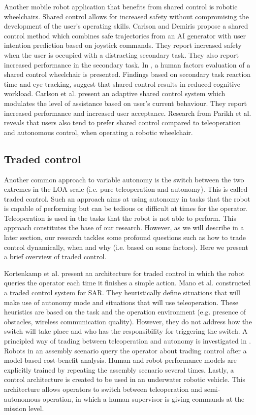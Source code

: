 \documentclass[a4paper,12pt,oneside,openright]{bhamthesis}
\begin{document}
Another mobile robot application that benefits from shared control is robotic wheelchairs. Shared control allows for increased safety without compromising the development of the user's operating skills. Carlson and Demiris \citep{Carlson2010} propose a shared control method which combines safe trajectories from an AI generator with user intention prediction based on joystick commands. They report increased safety when the user is occupied with a distracting secondary task. They also report increased performance in the secondary task. In \citep{Carlson2012}, a human factors evaluation of a shared control wheelchair is presented. Findings based on secondary task reaction time and eye tracking, suggest that shared control results in reduced cognitive workload. Carlson et al. \citep{Carlson2012a} present an adaptive shared control system which modulates the level of assistance based on user's current behaviour. They report increased performance and increased user acceptance. Research from Parikh et al. \citep{Parikh2005} reveals that users also tend to prefer shared control compared to teleoperation and autonomous control, when operating a robotic wheelchair.

\subsection{Traded control}
Another common approach to variable autonomy is the switch between the two extremes in the LOA scale (i.e. pure teleoperation and autonomy). This is called traded control. Such an approach aims at using autonomy in tasks that the robot is capable of performing but can be tedious or difficult at times for the operator. Teleoperation is used in the tasks that the robot is not able to perform. This approach constitutes the base of our research. However, as we will describe in a later section, our research tackles some profound questions such as how to trade control dynamically, when and why (i.e. based on some factors). Here we present a brief overview of traded control.

Kortenkamp et al. \citep{Kortenkamp2000} present an architecture for traded control in which the robot queries the operator each time it finishes a simple action. Mano et al. \citep{Mano2009} constructed a traded control system for SAR. They heuristically define situations that will make use of autonomy mode and situations that will use teleoperation. These heuristics are based on the task and the operation environment (e.g. presence of obstacles, wireless communication quality). However, they do not address how the switch will take place and who has the responsibility for triggering the switch. A principled way of trading between teleoperation and autonomy is investigated in \citep{Sellner2005}. Robots in an assembly scenario query the operator about trading control after a model-based cost-benefit analysis. Human and robot performance models are explicitly trained by repeating the assembly scenario several times. Lastly, a control architecture is created \citep{Kim2004} to be used in an underwater robotic vehicle. This architecture allows operators to switch between teleoperation and semi-autonomous operation, in which a human supervisor is giving commands at the mission level.
\end{document}

